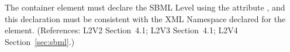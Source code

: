 The  container element must declare the SBML Level
using the attribute , and this declaration must be
consistent with the XML Namespace declared for the 
element.  (References: L2V2 Section~4.1; L2V3 Section~4.1; L2V4 Section~\ref{sec:sbml}.)
